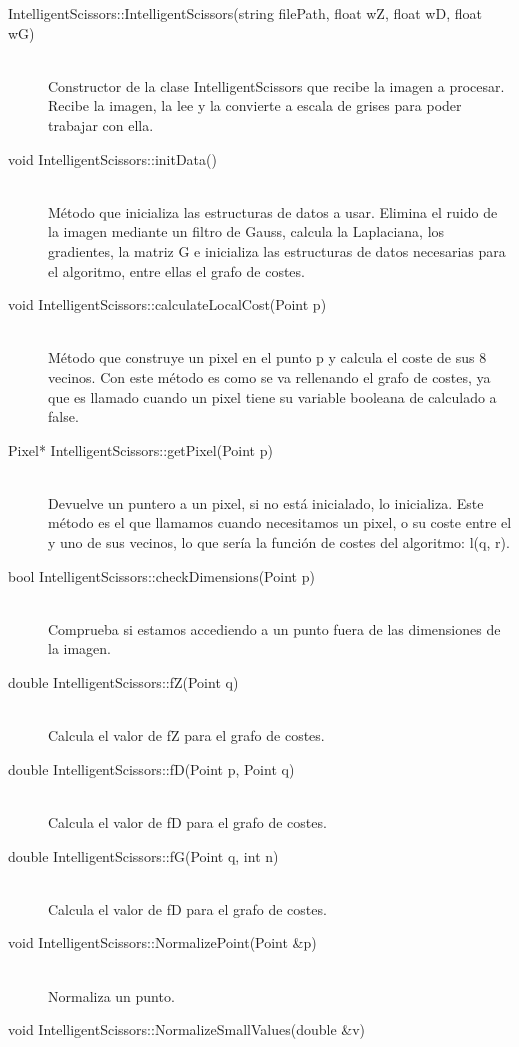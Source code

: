 \begin{description}
\item[IntelligentScissors::IntelligentScissors(string filePath, float wZ, float wD, float wG)]\hfill \\
	Constructor de la clase IntelligentScissors que recibe la imagen a procesar. Recibe la 	imagen, la lee y la convierte a escala de grises para poder trabajar con ella.	
\item[void IntelligentScissors::initData()]\hfill \\
	Método que inicializa las estructuras de datos a usar. Elimina el ruido de la imagen mediante un filtro de Gauss, calcula la Laplaciana, los gradientes, la matriz G e inicializa las estructuras de datos necesarias para el algoritmo, entre ellas el grafo de costes.
\item[void IntelligentScissors::calculateLocalCost(Point p)]\hfill \\
	Método que construye un pixel en el punto p y calcula el coste de sus 8 vecinos. Con este método es como se va rellenando el grafo de costes, ya que es llamado cuando un pixel tiene su variable booleana de calculado a false.
\item[Pixel* IntelligentScissors::getPixel(Point p)]\hfill \\
	Devuelve un puntero a un pixel, si no está inicialado, lo inicializa. Este método es el que llamamos cuando necesitamos un pixel, o su coste entre el y uno de sus vecinos, lo que sería la función de costes del algoritmo: l(q, r).
\item[bool IntelligentScissors::checkDimensions(Point p)]\hfill \\
	Comprueba si estamos accediendo a un punto fuera de las dimensiones de la imagen.
\item[double IntelligentScissors::fZ(Point q)]\hfill \\
	Calcula el valor de fZ para el grafo de costes.
\item[double IntelligentScissors::fD(Point p, Point q)]\hfill \\
	Calcula el valor de fD para el grafo de costes.
\item[double IntelligentScissors::fG(Point q, int n)]\hfill \\
	Calcula el valor de fD para el grafo de costes.
\item[void IntelligentScissors::NormalizePoint(Point &p)]\hfill \\
	Normaliza un punto.
\item[void IntelligentScissors::NormalizeSmallValues(double &v)]\hfill \\

\end{description}
